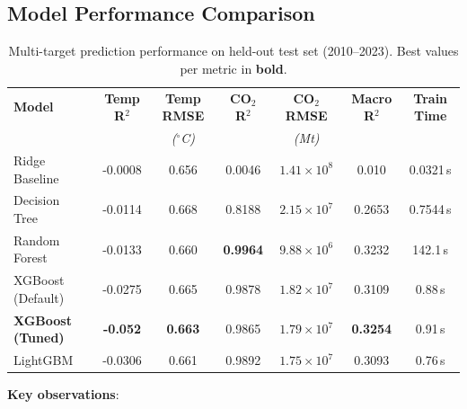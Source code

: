 \documentclass[12pt, a4paper]{article}
\begin{document}
\subsection{Model Performance Comparison}
\begin{table}[h!]
    \centering
    \caption{Multi-target prediction performance on held-out test set (2010--2023). Best values per metric in \textbf{bold}.}
    \label{tab:results}
    \begin{tabular}{lcccccc}
        \toprule
        \textbf{Model} & \textbf{Temp R$^2$} & \textbf{Temp RMSE} & \textbf{CO$_2$ R$^2$} & \textbf{CO$_2$ RMSE} & \textbf{Macro R$^2$} & \textbf{Train Time} \\
        & & \textit{($^\circ$C)} & & \textit{(Mt)} & & \\
        \midrule
        Ridge Baseline & -0.0008 & 0.656 & 0.0046 & $1.41 \times 10^8$ & 0.010 & 0.0321\,s \\
        Decision Tree & -0.0114 & 0.668 & 0.8188 & $2.15 \times 10^7$ & 0.2653 & 0.7544\,s \\
        Random Forest & -0.0133 & 0.660 & \textbf{0.9964} & $9.88 \times 10^6$ & 0.3232 & 142.1\,s \\
        XGBoost (Default) & -0.0275 & 0.665 & 0.9878 & $1.82 \times 10^7$ & 0.3109 & 0.88\,s \\
        \textbf{XGBoost (Tuned)} & \textbf{-0.052} & \textbf{0.663} & 0.9865 & \textbf{$1.79 \times 10^7$} & \textbf{0.3254} & 0.91\,s \\
        LightGBM & -0.0306 & 0.661 & 0.9892 & $1.75 \times 10^7$ & 0.3093 & 0.76\,s \\
        \bottomrule
    \end{tabular}
\end{table}
\noindent\textbf{Key observations}:
\end{document}
